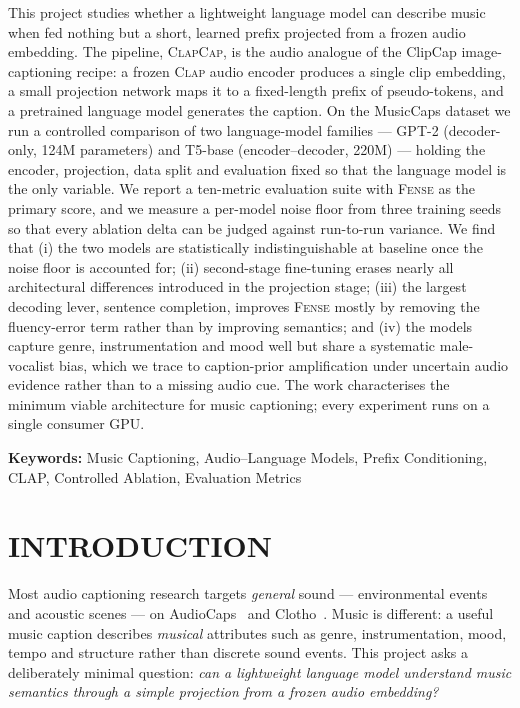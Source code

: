 \documentclass[9pt]{report}
\newcommand{\fense}{\textsc{Fense}}
\newcommand{\clapenc}{\textsc{Clap}}
\newcommand{\sys}{\textsc{ClapCap}}
\begin{document}
This project studies whether a lightweight language model can describe music when fed
nothing but a short, learned prefix projected from a frozen audio embedding. The pipeline,
\sys{}, is the audio analogue of the ClipCap image-captioning recipe: a frozen \clapenc{} audio
encoder produces a single clip embedding, a small projection network maps it to a fixed-length
prefix of pseudo-tokens, and a pretrained language model generates the caption. On the MusicCaps
dataset we run a controlled comparison of two language-model families --- GPT-2 (decoder-only,
124M parameters) and T5-base (encoder--decoder, 220M) --- holding the encoder, projection, data
split and evaluation fixed so that the language model is the only variable. We report a
ten-metric evaluation suite with \fense{} as the primary score, and we measure a per-model
noise floor from three training seeds so that every ablation delta can be judged against
run-to-run variance. We find that (i) the two models are statistically indistinguishable at
baseline once the noise floor is accounted for; (ii) second-stage fine-tuning erases nearly all
architectural differences introduced in the projection stage; (iii) the largest decoding lever,
sentence completion, improves \fense{} mostly by removing the fluency-error term rather than by
improving semantics; and (iv) the models capture genre, instrumentation and mood well but share
a systematic male-vocalist bias, which we trace to caption-prior amplification under uncertain
audio evidence rather than to a missing audio cue. The work characterises the minimum viable
architecture for music captioning; every experiment runs on a single consumer GPU.

\vspace{0.5cm}

\noindent \textbf{Keywords:} Music Captioning, Audio--Language Models, Prefix Conditioning, CLAP, Controlled Ablation, Evaluation Metrics

{\hypersetup{linkcolor=black}
\tableofcontents
}
\newpage

\chapter{INTRODUCTION}

Most audio captioning research targets \emph{general} sound --- environmental events and
acoustic scenes --- on AudioCaps~\cite{kim2019audiocaps} and Clotho~\cite{drossos2020clotho}.
Music is different: a useful music caption describes \emph{musical} attributes such as genre,
instrumentation, mood, tempo and structure rather than discrete sound events. This project asks
a deliberately minimal question: \emph{can a lightweight language model understand music
semantics through a simple projection from a frozen audio embedding?}
\end{document}
